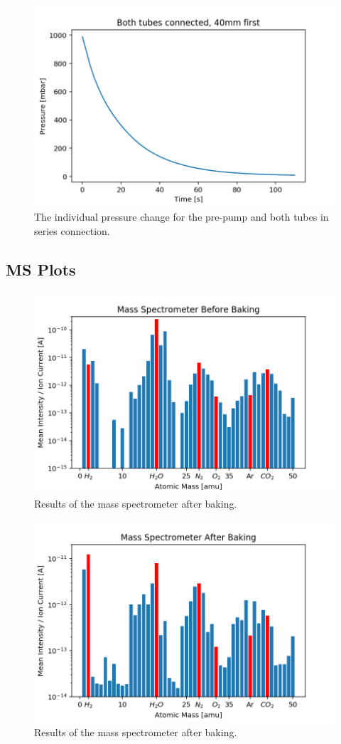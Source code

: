 \documentclass[]{article}
\begin{document}
\begin{figure}[!h]
\centering\includegraphics[width=.5\textwidth]{Plots/BothTubes.png}
\caption{The individual pressure change for the pre-pump and both tubes in series connection.}
\label{fig::BothTubes}
\end{figure}


\subsection{MS Plots}
\label{MS Plots}

\begin{figure}[!h]
\centering\includegraphics[width=.5\textwidth]{Plots/MSbefore.png}
\caption{Results of the mass spectrometer after baking.}
\label{fig::MSbefore}
\end{figure}

\begin{figure}[!h]
\centering\includegraphics[width=.5\textwidth]{Plots/MSafter.png}
\caption{Results of the mass spectrometer after baking.}
\label{fig::MSafter}
\end{figure}
\end{document}
